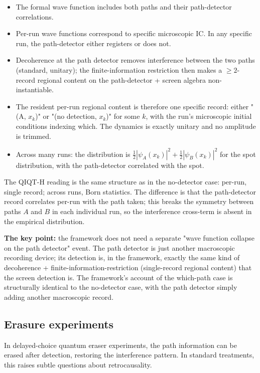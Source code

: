 \documentclass[11pt,a4paper]{article}
\begin{document}
\begin{itemize}
  \item The formal wave function includes both paths and their path-detector correlations.
  \item Per-run wave functions correspond to specific microscopic IC. In any specific run, the path-detector either registers or does not.
  \item Decoherence at the path detector removes interference between the two paths (standard, unitary); the finite-information restriction then makes a $\ge 2$-record regional content on the path-detector + screen algebra non-instantiable.
  \item The resident per-run regional content is therefore one specific record: either "(A, $x_k$)" or "(no detection, $x_k$)" for some $k$, with the run's microscopic initial conditions indexing which. The dynamics is exactly unitary and no amplitude is trimmed.
  \item Across many runs: the distribution is $\frac{1}{2}|\psi_A(x_k)|^2 + \frac{1}{2}|\psi_B(x_k)|^2$ for the spot distribution, with the path-detector correlated with the spot.
\end{itemize}

The QIQT-H reading is the same structure as in the no-detector case: per-run, single record; across runs, Born statistics. The difference is that the path-detector record correlates per-run with the path taken; this breaks the symmetry between paths $A$ and $B$ in each individual run, so the interference cross-term is absent in the empirical distribution.

\textbf{The key point:} the framework does not need a separate "wave function collapse on the path detector" event. The path detector is just another macroscopic recording device; its detection is, in the framework, exactly the same kind of decoherence + finite-information-restriction (single-record regional content) that the screen detection is. The framework's account of the which-path case is structurally identical to the no-detector case, with the path detector simply adding another macroscopic record.

\subsection{Erasure experiments}

In delayed-choice quantum eraser experiments, the path information can be erased after detection, restoring the interference pattern. In standard treatments, this raises subtle questions about retrocausality.
\end{document}
